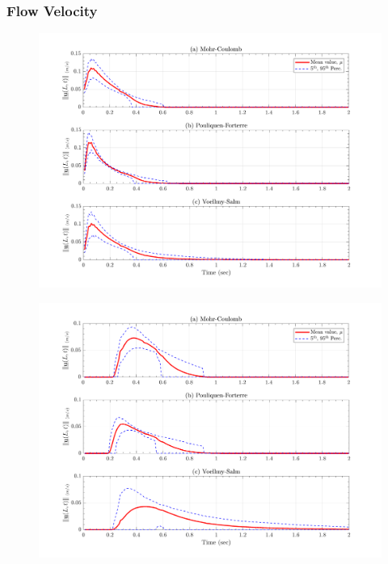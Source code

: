 \documentclass{article}
\begin{document}
\subsubsection{Flow Velocity}
\begin{figure}[H]
	\begin{minipage}[b]{0.5\linewidth}
    	\centering
    	\includegraphics[width=1\textwidth]{InclinedPlane/Velocity/Vel_L1.png}
    	\label{fig:Ramp-L1-Vel}
	\end{minipage}
	\begin{minipage}[b]{0.5\linewidth}
		\centering
		\includegraphics[width=1\textwidth]{InclinedPlane/Velocity/Vel_L2.png}
    	\label{fig:Ramp-L2-Vel}
    \end{minipage}


\end{figure}
\end{document}
